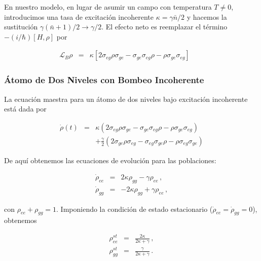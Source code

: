 \documentclass[12pt]{article}
\begin{document}
En nuestro modelo, en lugar de asumir un campo con temperatura $T \neq 0$, introducimos una tasa de excitación incoherente $\kappa = \gamma \bar{n}/2$ y hacemos la sustitución $\gamma (\bar{n}+1)/2 \to \gamma/2$. El efecto neto es reemplazar el término $-(i/\hbar) [H,\rho]$ por

\begin{eqnarray}
\mathcal{L}_B \rho &=& \kappa [ 2\sigma_{eg} \rho \sigma_{ge} 
	-\sigma_{ge} \sigma_{eg} \rho -\rho \sigma_{ge} \sigma_{eg} ] 	
	\qquad
\end{eqnarray}

\subsubsection{Átomo de Dos Niveles con Bombeo Incoherente}

La ecuación maestra para un átomo de dos niveles bajo excitación incoherente está dada por

\begin{eqnarray}
\dot{\rho}(t) &=&  \kappa (2\sigma_{eg} \rho \sigma_{ge} 
  	-\sigma_{ge} \sigma_{eg} \rho  -\rho \sigma_{ge} \sigma_{eg})     
  	\nonumber \\
&&+\frac{\gamma}{2} (2\sigma_{ge} \rho \sigma_{eg} 
  	-\sigma_{eg} \sigma_{ge} \rho  -\rho \sigma_{eg} \sigma_{ge})     
\end{eqnarray}

De aquí obtenemos las ecuaciones de evolución para las poblaciones:

\begin{subequations}
\begin{eqnarray}
\dot{\rho}_{ee} &=& 2\kappa \rho_{gg} -\gamma \rho_{ee} \,, \\ 
\dot{\rho}_{gg} &=& -2\kappa \rho_{gg} +\gamma \rho_{ee} \,, 
\end{eqnarray}
\end{subequations}

con $\rho_{ee} + \rho_{gg} = 1$. Imponiendo la condición de estado estacionario ($\dot{\rho}_{ee} = \dot{\rho}_{gg} = 0$), obtenemos

\begin{subequations}
\begin{eqnarray}
\rho_{ee}^{st} &=& \frac{2\kappa}{2\kappa + \gamma} \,, \\
\rho_{gg}^{st} &=& \frac{\gamma}{2\kappa + \gamma} \,. 
\end{eqnarray}
\end{subequations}
\end{document}
